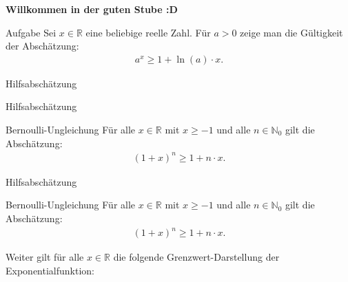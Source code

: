 \documentclass[10pt]{beamer}
\title{}
\author{Artur's \( \oint \) Mathematikstübchen}
\date{}
\def\bN{\mathbb{N}}
\def\bR{\mathbb{R}}
\begin{document}

\begin{frame}
    \begin{center}
        \textbf{\huge Willkommen in der guten Stube \newline \newline :D}
    \end{center}
\end{frame}




\begin{frame}
    \begin{alertblock}{Aufgabe}
        Sei \( x \in \bR \) eine beliebige reelle Zahl. Für \( a > 0 \) zeige  man die Gültigkeit der Abschätzung:
        \begin{align*}
            a^{x}
            \geq 1 + \ln( a ) \cdot x.
        \end{align*}
    \end{alertblock}
\end{frame}



\begin{frame}{Hilfsabschätzung}
    
\end{frame}



\begin{frame}{Hilfsabschätzung}
    \begin{block}{Bernoulli-Ungleichung}
        Für alle \( x \in \bR \) mit \( x \geq - 1 \) und alle \( n \in \bN_{0} \) gilt die Abschätzung:
        \begin{align*}
            \left( 1 + x \right)^{n}
            \geq 1 + n \cdot x.
        \end{align*}
    \end{block}
\end{frame}



\begin{frame}{Hilfsabschätzung}
    \begin{block}{Bernoulli-Ungleichung}
        Für alle \( x \in \bR \) mit \( x \geq - 1 \) und alle \( n \in \bN_{0} \) gilt die Abschätzung:
        \begin{align*}
            \left( 1 + x \right)^{n}
            \geq 1 + n \cdot x.
        \end{align*}
    \end{block}
    Weiter gilt für alle \( x \in \bR \) die folgende Grenzwert-Darstellung der Exponentialfunktion:
\end{frame}
\end{document}
